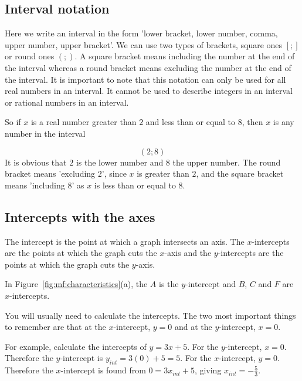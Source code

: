 \subsection*{Interval notation}
\nopagebreak
Here we write an interval in the form 'lower bracket, lower number, comma, upper number, upper bracket'. We can use two types of brackets, square ones $[;]$ or round ones $(;)$. A square bracket means including the number at the end of the interval whereas a round bracket means excluding the number at the end of the interval. It is important to note that this notation can only be used for all real numbers in an interval. It cannot be used to describe integers in an interval or rational numbers in an interval.\par 
So if $x$ is a real number greater than $2$ and less than or equal to $8$, then $x$ is any number in the interval\par 
\nopagebreak\noindent{}
\begin{equation*}
(2;8)
\end{equation*}
It is obvious that $2$ is the lower number and $8$ the upper number. The round bracket means 'excluding $2$', since $x$ is greater than $2$, and the square bracket means 'including $8$' as $x$ is less than or equal to $8$.\par 

\subsection*{Intercepts with the axes}
\nopagebreak
The intercept is the point at which a graph intersects an axis. The $x$-intercepts are the points at which the graph cuts the $x$-axis and the $y$-intercepts are the points at which the graph cuts the $y$-axis.\par 
In Figure~\ref{fig:mf:characteristics}(a), the $A$ is the $y$-intercept and $B$, $C$ and $F$ are $x$-intercepts.\par 
You will usually need to calculate the intercepts. The two most important things to remember are that at the $x$-intercept, $y=0$ and at the $y$-intercept, $x=0$.\par 
For example, calculate the intercepts of $y=3x+5$. For the $y$-intercept, $x=0$. Therefore the $y$-intercept is ${y}_{int}=3(0)+5=5$. For the $x$-intercept, $y=0$. Therefore the $x$-intercept is found from $0=3{x}_{int}+5$, giving ${x}_{int}=-\frac{5}{3}$.\par 

